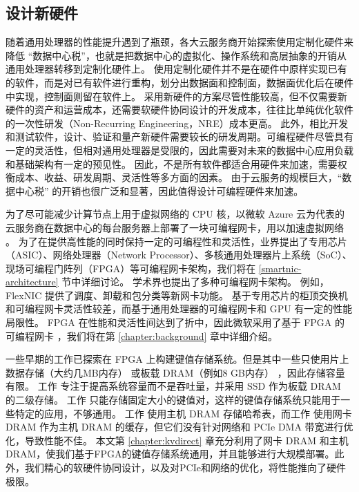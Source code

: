 \subsection{设计新硬件}

随着通用处理器的性能提升遇到了瓶颈，各大云服务商开始探索使用定制化硬件来降低 ``数据中心税''，也就是把数据中心的虚拟化、操作系统和高层抽象的开销从通用处理器转移到定制化硬件上。
使用定制化硬件并不是在硬件中原样实现已有的软件，而是对已有软件进行重构，划分出数据面和控制面，数据面优化后在硬件中实现，控制面则留在软件上。
采用新硬件的方案尽管性能较高，但不仅需要新硬件的资产和运营成本，还需要软硬件协同设计的开发成本，往往比单纯优化软件的一次性研发（Non-Recurring Engineering，NRE）成本更高。
此外，相比开发和测试软件，设计、验证和量产新硬件需要较长的研发周期。可编程硬件尽管具有一定的灵活性，但相对通用处理器是受限的，因此需要对未来的数据中心应用负载和基础架构有一定的预见性。
因此，不是所有软件都适合用硬件来加速，需要权衡成本、收益、研发周期、灵活性等多方面的因素。
由于云服务的规模巨大，``数据中心税'' 的开销也很广泛和显著，因此值得设计可编程硬件来加速。

为了尽可能减少计算节点上用于虚拟网络的 CPU 核，以微软 Azure 云为代表的云服务商在数据中心的每台服务器上部署了一块可编程网卡，用以加速虚拟网络 \cite{smartnic}。
为了在提供高性能的同时保持一定的可编程性和灵活性，业界提出了专用芯片（ASIC）、网络处理器（Network Processor）、多核通用处理器片上系统（SoC）、现场可编程门阵列（FPGA）等可编程网卡架构，我们将在 \ref{smartnic-architecture} 节中详细讨论。
学术界也提出了多种可编程网卡架构。
例如，FlexNIC \cite{kaufmann2016high} 提供了调度、卸载和包分类等新网卡功能。
基于专用芯片的柜顶交换机和可编程网卡灵活性较差，而基于通用处理器的可编程网卡和 GPU 有一定的性能局限性。
FPGA 在性能和灵活性间达到了折中，因此微软采用了基于 FPGA 的可编程网卡 \cite{putnam2014reconfigurable}，我们将在第 \ref{chapter:background} 章中详细介绍。

一些早期的工作已探索在 FPGA 上构建键值存储系统。但是其中一些只使用片上数据存储（大约几MB内存） \cite {liang16fpl} 或板载 DRAM（例如8 GB内存） \cite {istvan2013flexible,chalamalasetti2013fpga,istvan2015hash}，因此存储容量有限。
工作 \cite {blott2015scaling} 专注于提高系统容量而不是吞吐量，并采用 SSD 作为板载 DRAM 的二级存储。
工作 \cite {liang16fpl,chalamalasetti2013fpga} 只能存储固定大小的键值对，这样的键值存储系统只能用于一些特定的应用，不够通用。
工作 \cite {blott13hotcloud,lavasani2014fpga} 使用主机 DRAM 存储哈希表，而工作 \cite {tokusashi2016multilevel} 使用网卡 DRAM 作为主机 DRAM 的缓存，但它们没有针对网络和 PCIe DMA 带宽进行优化，导致性能不佳。
本文第 \ref{chapter:kvdirect} 章充分利用了网卡 DRAM 和主机 DRAM，使我们基于FPGA的键值存储系统通用，并且能够进行大规模部署。此外，我们精心的软硬件协同设计，以及对PCIe和网络的优化，将性能推向了硬件极限。




